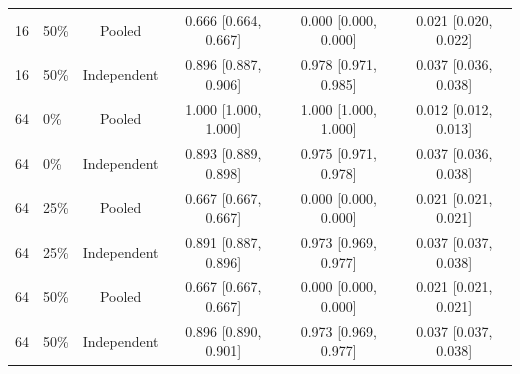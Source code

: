 \begin{table}[!htbp]
\begin{tabular}{@{}llcccc@{}}
16 & 50\% & Pooled & 0.666 [0.664, 0.667] & 0.000 [0.000, 0.000] & 0.021 [0.020, 0.022] \\
16 & 50\% & Independent & 0.896 [0.887, 0.906] & 0.978 [0.971, 0.985] & 0.037 [0.036, 0.038] \\
64 & 0\% & Pooled & 1.000 [1.000, 1.000] & 1.000 [1.000, 1.000] & 0.012 [0.012, 0.013] \\
64 & 0\% & Independent & 0.893 [0.889, 0.898] & 0.975 [0.971, 0.978] & 0.037 [0.036, 0.038] \\
64 & 25\% & Pooled & 0.667 [0.667, 0.667] & 0.000 [0.000, 0.000] & 0.021 [0.021, 0.021] \\
64 & 25\% & Independent & 0.891 [0.887, 0.896] & 0.973 [0.969, 0.977] & 0.037 [0.037, 0.038] \\
64 & 50\% & Pooled & 0.667 [0.667, 0.667] & 0.000 [0.000, 0.000] & 0.021 [0.021, 0.021] \\
64 & 50\% & Independent & 0.896 [0.890, 0.901] & 0.973 [0.969, 0.977] & 0.037 [0.037, 0.038] \\
\bottomrule
\end{tabular}
\end{table}
